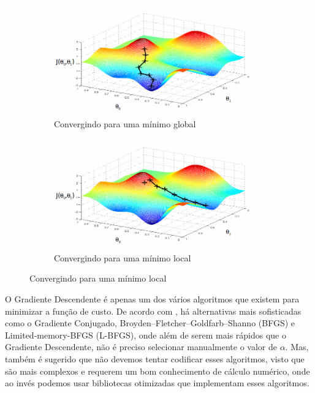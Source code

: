 \begin{figure}
  \caption{Funcionamento do Gradiente Descendente}
  \begin{subfigure}[htb]{0.5\textwidth} 
    \includegraphics[width=\textwidth]{img/funcgraddesc1}
    \caption{Convergindo para uma mínimo global} \label{fig:funcgraddesc}
  \end{subfigure}
  \begin{subfigure}[htb]{0.5\textwidth} 
    \includegraphics[width=\textwidth]{img/funcgraddesc2}
    \caption{Convergindo para uma mínimo local} \label{fig:funcgraddescnot}
  \end{subfigure}

\end{figure}

O Gradiente Descendente é apenas um dos vários algoritmos que existem para minimizar a função de custo. De acordo com , há alternativas mais sofisticadas como o Gradiente Conjugado, Broyden–Fletcher–Goldfarb–Shanno (BFGS) e Limited-memory-BFGS (L-BFGS), onde além de serem mais rápidos que o Gradiente Descendente, não é preciso selecionar manualmente o valor de $\alpha$. Mas, também é sugerido que não devemos tentar codificar esses algoritmos, visto que são mais complexos e requerem um bom conhecimento de cálculo numérico, onde ao invés podemos usar bibliotecas otimizadas que implementam esses algoritmos.


